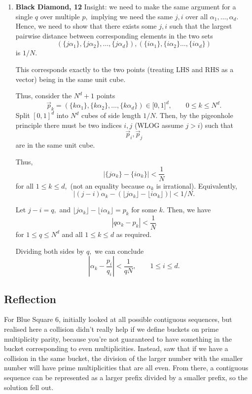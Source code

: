 \documentclass[12pt]{article}
\begin{document}
\begin{enumerate}
\begin{enumerate}
        Therefore, the set of $p, q$ must be infinite, meaning there
        are infinitely many $p, q$ such that
        $$
        \left | \alpha - \dfrac{p}{q} \right| < \dfrac{1}{Nq}.
        $$
        Since $N \geq q,$ $1/ Nq \leq 1/q^2,$ and thus there are
        infinitely many $p, q$ such that
        $$
        \left|\alpha - \dfrac{p}{q}\right| < \dfrac{1}{q^2}.
        $$
    \end{enumerate}

  \item \textbf{Black Diamond, 12} Insight: we need to make the same
    argument for a single $q$ over multiple $p,$ implying we need the
    same $j, i$ over all $\alpha_1, \ldots, \alpha_d.$ Hence, we need
    to show that there exists some $j, i$ such that the largest
    pairwise distance between corresponding elements in the two sets
    $$
    (\{j \alpha_1\}, \{j\alpha_2\}, \ldots, \{j \alpha_d\}), (\{i
    \alpha_1\}, \{i \alpha_2\} \ldots, \{i \alpha_d\})
    $$
    is $1/N.$

    This corresponds exactly to the two points (treating LHS and RHS
    as a vector) being in the same unit cube.

    Thus, consider the $N^d + 1$ points
    $$
    \vec p_k = (\{k\alpha_1\}, \{k\alpha_2\}, \ldots, \{k\alpha_d\})
    \in \mathbb [0, 1]^{d}, \qquad 0 \leq k \leq N^d.
    $$
    Split $[0, 1]^d$ into $N^d$ cubes of side length $1 /N.$ Then, by
    the pigeonhole principle there must be two indices $i, j$ (WLOG
    assume $j > i$) such that
    $$
    \vec p_i, \vec p_j
    $$
    are in the same unit cube.

    Thus,
    $$
    |\{j \alpha_k\} - \{i\alpha_k\}| < \dfrac{1}{N}
    $$
    for all $1 \leq k \leq d,$ (not an equality because $\alpha_k$ is
    irrational). Equivalently,
    $$
    |(j - i) \alpha_k - (\lfloor j\alpha_k\rfloor - \lfloor i
    \alpha_k\rfloor)| < 1/N.
    $$

    Let $j - i = q,$ and $\lfloor j\alpha_k\rfloor - \lfloor
    i\alpha_k\rfloor =p_k$ for some $k.$ Then, we have
    $$
    |q\alpha_k - p_k| < \dfrac{1}{N}
    $$
    for $1 \leq q \leq N^d$ and all $1 \leq k \leq d$ as required.

    Dividing both sides by $q,$ we can conclude
    $$
    \left|\alpha_k - \dfrac{p_i}{q_i}\right| < \dfrac{1}{qN}, \qquad
    1 \leq i \leq d.
    $$
\end{enumerate}

\subsection{Reflection}
For Blue Square 6, initially looked at all possible contiguous
sequences, but realised here a collision didn't really help if we
define buckets on prime multiplicity parity, because you're not
guaranteed to have something in the bucket corresponding to even
multiplicities. Instead, saw that if we have a collision in the same
bucket, the division of the larger number with the smaller number
will have prime multiplicities that are all even. From there, a
contiguous sequence can be represented as a larger prefix divided by
a smaller prefix, so the solution fell out.
\end{document}
